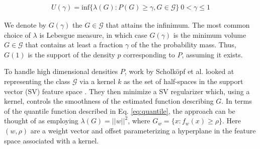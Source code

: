 \documentclass[10pt, conference]{ieeeconf}      %
\begin{document}
\vspace{-2ex}
\begin{align}\label{eq:quantile}
U(\gamma) = \mbox{inf} \lbrace \lambda(G):P(G) \geq \gamma, G \in \mathcal{G} \rbrace \: 0<\gamma \leq 1
\end{align} 


We denote by $G(\gamma)$ the $G \in \mathcal{G}$ that attains the infinimum. The most common choice of $\lambda$ is Lebesgue measure, in which case $G(\gamma)$ is the minimum volume $G \in \mathcal{G}$ that contains at least a fraction $\gamma$ of the the probability mass. Thus, $G(1)$ is the support of the density $p$ corresponding to $P$, assuming it exists. 

To handle high dimensional densities $P$, work by Scholk{\"o}pf et al.  looked at representing the class $\mathcal{G}$ via a kernel $k$ as the set of half-spaces in the support vector (SV) feature space \cite{scholkopf2001estimating}. They then minimize a SV  regularizer which, using a kernel, controls the smoothness of the estimated function describing $G$. In terms of the quantile function described in Eq. \ref{eq:quantile}, the approach can be thought of as employing $\lambda(G) = ||w||^2$, where $G_w = \lbrace x: f_w(x) \geq \rho \rbrace$. Here $(w,\rho)$ are a weight vector and offset parameterizing a hyperplane in the feature space associated with a kernel. 
\end{document}
